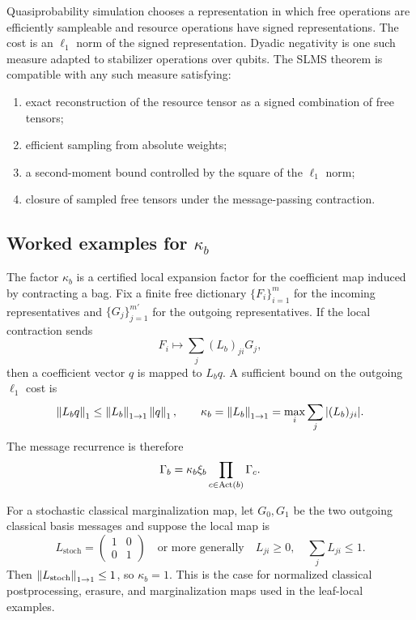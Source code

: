 Quasiprobability simulation chooses a representation in which free operations are efficiently sampleable and resource operations have signed representations. The cost is an \(\ell_1\) norm of the signed representation. Dyadic negativity is one such measure adapted to stabilizer operations over qubits. The SLMS theorem is compatible with any such measure satisfying:
\begin{enumerate}[leftmargin=1.2cm]
\item exact reconstruction of the resource tensor as a signed combination of free tensors;
\item efficient sampling from absolute weights;
\item a second-moment bound controlled by the square of the \(\ell_1\) norm;
\item closure of sampled free tensors under the message-passing contraction.
\end{enumerate}

\subsection{Worked examples for \texorpdfstring{\(\kappa_b\)}{kappa}}
\label{app:kappa-example}

The factor \(\kappa_b\) is a certified local expansion factor for the coefficient map induced by contracting a bag. Fix a finite free dictionary \(\{F_i\}_{i=1}^m\) for the incoming representatives and \(\{G_j\}_{j=1}^{m'}\) for the outgoing representatives. If the local contraction sends
\[
F_i\longmapsto \sum_j (L_b)_{j i}G_j,
\]
then a coefficient vector \(q\) is mapped to \(L_b q\). A sufficient bound on the outgoing \(\ell_1\) cost is
\[
\left\lVert L_b q \right\rVert_1\le \left\lVert L_b \right\rVert_{1\to 1}\left\lVert q \right\rVert_1,
\qquad
\kappa_b=\left\lVert L_b \right\rVert_{1\to1}
=\max_i\sum_j |(L_b)_{j i}|.
\]
The message recurrence is therefore
\[
\Gamma_b=\kappa_b\xi_b\prod_{c\in\operatorname{Act}(b)}\Gamma_c .
\]

For a stochastic classical marginalization map, let \(G_0,G_1\) be the two outgoing classical basis messages and suppose the local map is
\[
L_{\mathrm{stoch}}
=
\begin{pmatrix}
1 & 0 \\
0 & 1
\end{pmatrix}
\quad\text{or more generally}\quad
L_{j i}\ge 0,\quad \sum_j L_{j i}\le 1 .
\]
Then \(\left\lVert L_{\mathrm{stoch}} \right\rVert_{1\to1}\le 1\), so \(\kappa_b=1\). This is the case for normalized classical postprocessing, erasure, and marginalization maps used in the leaf-local examples.

